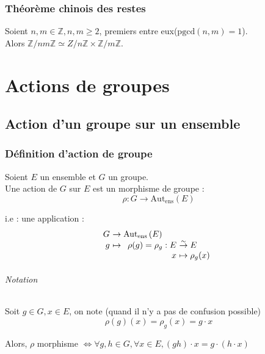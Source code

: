 \documentclass[a4paper,10pt]{report}
\newcommand{\IZ}{\mathbb{Z}} %
\newcommand{\bij}{\overset{\sim}{\to}} %
\newcommand{\pgcd}{\mathrm{pgcd}} %
\newcommand{\Autens}[1]{\text{Aut}_{\text{ens}}\left(#1\right)}
\begin{document}
  \section{Théorème chinois des restes}
   Soient $n,m \in \IZ, n,m \geq 2$, premiers entre eux($\pgcd(n,m)=1$).\\
   Alors $\IZ/nm\IZ \simeq Z/n\IZ \times \IZ/m\IZ$.

\part{Actions de groupes}
 \chapter{Action d'un groupe sur un ensemble}
  \section{Définition d'action de groupe}
   Soient $E$ un ensemble et $G$ un groupe.\\
   Une action de $G$ sur $E$ est un morphisme de groupe :
   $$\rho : G \to \Autens{E}$$

   i.e : une application :$$
   \begin{array}{r@{\ }l}
     G & \to \Autens{E}\\
     g & \mapsto
     \begin{array}[t]{r@{\ }l}
       \rho(g)=\rho_g : E & \bij E\\
       x & \mapsto \rho_g(x)
     \end{array}
   \end{array}$$

   \paragraph{Notation} Soit $g \in G, x \in E$, on note (quand il n'y a
   pas de confusion possible)
   $$\rho(g)(x)=\rho_g(x)=g\cdot x$$

   Alors, $\rho$ morphisme $\iff \forall g,h \in G, \forall x \in E,
   (gh) \cdot x = g \cdot (h \cdot x)$
\end{document}
